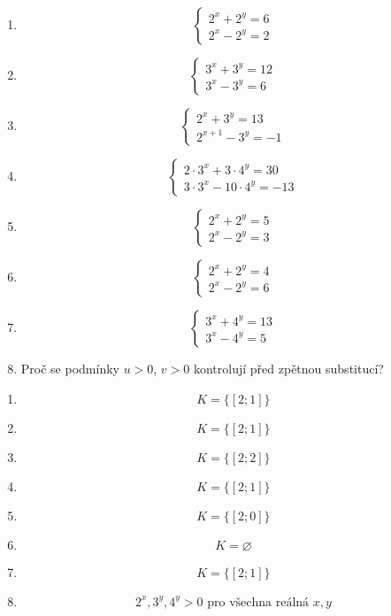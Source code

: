 \documentclass[11pt,a4paper]{article}
\begin{document}
\begin{zadaniReseniBox}[title={Samostatná práce 1}]
\begin{enumerate}[label=\alph*)]
\item \[
\begin{cases}2^x+2^y=6\\2^x-2^y=2\end{cases}
\]
\item \[
\begin{cases}3^x+3^y=12\\3^x-3^y=6\end{cases}
\]
\item \[\begin{cases}2^x+3^y=13\\2^{x+1}-3^y=-1\end{cases}\]
\item \[\begin{cases}2\cdot3^x+3\cdot4^y=30\\3\cdot3^x-10\cdot4^y=-13\end{cases}\]
\item \[
\begin{cases}2^x+2^y=5\\2^x-2^y=3\end{cases}
\]
\item \[\begin{cases}2^x+2^y=4\\2^x-2^y=6\end{cases}\]
\item \[
\begin{cases}3^x+4^y=13\\3^x-4^y=5\end{cases}
\]
\item Proč se podmínky $u>0$, $v>0$ kontrolují před zpětnou substitucí?
\end{enumerate}
\tcblower
\begin{enumerate}[label=\alph*)]
\item \[
K=\{[2;1]\}
\]
\item \[
K=\{[2;1]\}
\]
\item \[K=\{[2;2]\}\]
\item \[K=\{[2;1]\}\]
\item \[
K=\{[2;0]\}
\]
\item \[K=\varnothing\]
\item \[
K=\{[2;1]\}
\]
\item \[
2^x,3^y,4^y>0\text{ pro všechna reálná }x,y
\]
\end{enumerate}
\end{zadaniReseniBox}
\end{document}
